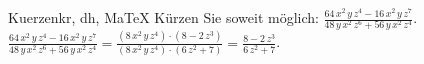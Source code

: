 \begin{MAufgabe}{Kuerzen}{kr, dh, MaTeX}
K\"urzen Sie soweit m\"oglich: $\frac{64\, x^2\, y\, z^4 - 16\, x^2\, y\, z^7}{48\, y\, x^2\, z^6 + 56\, y\, x^2\, z^4}$.\\ 
\ifLsg\MLoesung
\quad $\frac{64\, x^2\, y\, z^4 - 16\, x^2\, y\, z^7}{48\, y\, x^2\, z^6 + 56\, y\, x^2\, z^4}=\frac{(8\, x^2\, y\, z^4)\cdot(8 - 2\, z^3)}{(8\, x^2\, y\, z^4)\cdot(6\, z^2 + 7)}=\frac{8 - 2\, z^3}{6\, z^2 + 7}$.\else\relax\fi
 \end{MAufgabe}